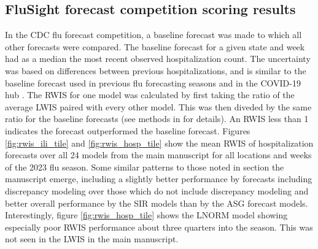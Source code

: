 \documentclass[ba]{imsart}
\theoremstyle{plain}
\theoremstyle{definition}
\theoremstyle{remark}
\begin{document}
\begin{supplement}
\newpage
\section{FluSight forecast competition scoring results} \label{app:A_rwis}

In the CDC flu forecast competition, a baseline forecast was made to which all other forecasts were compared. The baseline forecast for a given state and week had as a median the most recent observed hospitalization count. The uncertainty was based on differences between previous hospitalizations, and is similar to the baseline forecast used in previous flu forecasting seasons and in the COVID-19 hub \cite[]{mathis2024evaluation, cramer2022evaluation}. 
The RWIS for one model was calculated by first taking the ratio of the average LWIS paired with every other model. This was then diveded by the same ratio for the baseline forecasts (see methods in \cite{mathis2024evaluation} for details).
 An RWIS less than 1 indicates the forecast outperformed the baseline forecast.
 Figures \ref{fig:rwis_ili_tile} and \ref{fig:rwis_hosp_tile} show the mean RWIS of hospitalization forecasts over all 24 models from the main manuscript for all locations and weeks of the 2023 flu season. Some similar patterns to those noted in section the manuscript emerge, including a slightly better performance by forecasts including discrepancy modeling over those which do not include discrepancy modeling and better overall performance by the SIR models than by the ASG forecast models. Interestingly, figure \ref{fig:rwis_hosp_tile} shows the LNORM model showing especially poor RWIS performance about three quarters into the season. This was not seen in the LWIS in the main manuscript. %



\end{supplement}
\end{document}
